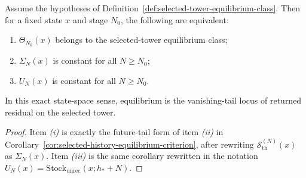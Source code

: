 \begin{corollary}
\label{cor:selected-tower-equilibrium-class}
Assume the hypotheses of
Definition~\ref{def:selected-tower-equilibrium-class}. Then for a fixed state
\(x\) and stage \(N_0\), the following are equivalent:
\begin{enumerate}[label=(\roman*), leftmargin=2em, itemsep=0.2em]
\item \(\Theta_{N_0}(x)\) belongs to the selected-tower equilibrium class;
\item \(\Sigma_N(x)\) is constant for all \(N\ge N_0\);
\item \(U_N(x)\) is constant for all \(N\ge N_0\).
\end{enumerate}
In this exact state-space sense, equilibrium is the vanishing-tail locus of
returned residual on the selected tower.
\end{corollary}

\begin{proof}
Item \emph{(i)} is exactly the future-tail form of item \emph{(ii)} in
Corollary~\ref{cor:selected-history-equilibrium-criterion}, after rewriting
\(\mathcal S_{\mathrm{th}}^{(N)}(x)\) as \(\Sigma_N(x)\). Item \emph{(iii)} is
the same corollary rewritten in the notation
\(U_N(x)=\mathrm{Stock}_{\mathrm{unrec}}(x;h_\ast+N)\).
\end{proof}

